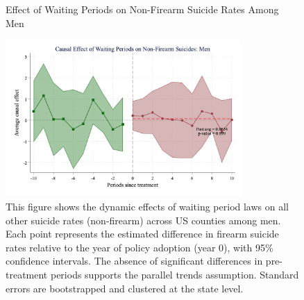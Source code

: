 \begin{figure}[htbp]
    \centering
    \caption{Effect of Waiting Periods on Non-Firearm Suicide Rates Among Men}
    \label{fig:firearm_suicide_DID_other_men}
    \includegraphics[width=0.8\textwidth]{figures/1040-csid-men-other-noNY.png}
    \begin{minipage}{\linewidth}
    \caption*{\footnotesize{
    This figure shows the dynamic effects of waiting period laws on all other suicide rates (non-firearm) across US counties among men. Each point represents the estimated difference in firearm suicide rates relative to the year of policy adoption (year 0), with 95\% confidence intervals. The absence of significant differences in pre-treatment periods supports the parallel trends assumption. Standard errors are bootstrapped and clustered at the state level.}}
  \end{minipage}
\end{figure}

\pagebreak
\clearpage

